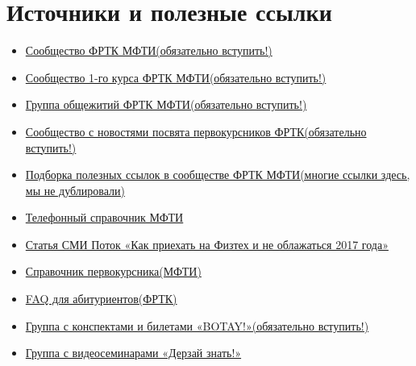 \documentclass[14pt]{extarticle}
\begin{document}
\section{Источники и полезные ссылки}
\begin{itemize}
    \item \href{https://vk.com/drec_mipt}{Сообщество ФРТК МФТИ(обязательно вступить!)}
    \item \href{https://vk.com/drec_81x}{Сообщество 1-го курса ФРТК МФТИ(обязательно вступить!)}
    \item \href{https://vk.com/frtk_dorm}{Группа общежитий ФРТК МФТИ(обязательно вступить!)}
    \item \href{https://vk.com/creativity_first}{Сообщество с новостями посвята первокурсников ФРТК(обязательно вступить!)}
    \item \href{https://vk.com/page-17708_53431599}{Подборка полезных ссылок в сообществе ФРТК МФТИ(многие ссылки здесь, мы не дублировали)}
    \item \href{https://mipt.ru/about/general/contacts/phones.php}{Телефонный справочник МФТИ}
    \item \href{http://miptstream.ru/2017/08/22/how_not_to_screw_up_3/}{Статья СМИ Поток «Как приехать на Физтех и не облажаться 2017 года»}
    \item \href{https://mipt.ru/students/1kurs.php}{Справочник первокурсника(МФТИ)}
    \item \href{https://mipt.ru/drec/abitur/faq.php}{FAQ для абитуриентов(ФРТК)}
    \item \href{https://mipt.ru/botay_phystech}{Группа с конспектами и билетами «BOTAY!»(обязательно вступить!)}
    \item \href{https://vk.com/dare_to_know}{Группа с видеосеминарами «Дерзай знать!»}
\end{itemize}
\end{document}
